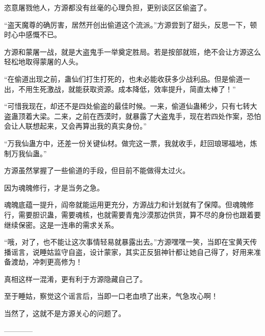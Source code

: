 \begin{this_body}
恣意屠戮他人，方源都没有丝毫的心理负担，更别谈区区偷盗了。

“盗天魔尊的确厉害，居然开创出偷道这个流派。”方源尝到了甜头，反思一下，顿时心中感慨不已。

方源和蒙屠一战，就是大盗鬼手一举奠定胜局。若是按部就班，绝不会让方源这么轻松地取得蒙屠的人头。

“在偷道出现之前，蛊仙们打生打死的，也未必能收获多少战利品。但是偷道一出，不用生死激战，就能获取资源。成本降低，效率提升，简直太棒了！”

“可惜我现在，却还不是四处偷盗的最佳时候。一来，偷道仙蛊稀少，只有七转大盗蛊顶着大梁。二来，之前在西漠时，就暴露了大盗鬼手，现在若四处作案，恐怕会让人联想起来，又会再算出我的真实身份。”

“万我仙蛊方中，还差一份关键仙材。做完这一票，我就收手，赶回琅琊福地，炼制万我仙蛊。”

方源虽然掌握了一些偷道的手段，但目前不能做得太过火。

因为魂魄修行，才是当务之急。

魂魄底蕴一提升，阎帝就能运用更充分，方源战力和计划就有了保障。但魂魄修行，需要胆识蛊，需要魂核，也就需要青鬼沙漠那边供货，算不尽的身份也跟着要继续保密。这是一连串的需求关系。

“哦，对了，也不能让这次事情轻易就暴露出去。”方源嘿嘿一笑，当即在宝黄天传播谣言，说睡姑监守自盗，设计蒙家，其实正反狙神针都让她自己得了，好用来准备渡劫，冲刺更高修为！

真相这样一混淆，更有利于方源隐藏自己了。

至于睡姑，察觉这个谣言后，当即一口老血喷了出来，气急攻心啊！

当然了，这就不是方源关心的问题了。

------------

\end{this_body}

